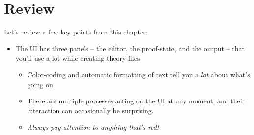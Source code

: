 \section{Review}
Let's review a few key points from this chapter:

\begin{itemize}
    \item The UI has three panels -- the editor, the proof-state, and the output -- that you'll use a lot while creating theory files

\begin{itemize}
        \item Color-coding and automatic formatting of text tell you a \textit{lot} about what's going on
        \item There are multiple processes acting on the UI at any moment, and their interaction can occasionally be surprising. 
        \item \textit{\textit{Always} pay attention to anything that's red!}
\end{itemize}


\end{itemize}
